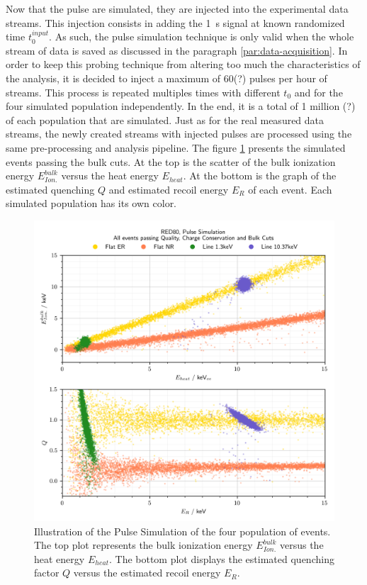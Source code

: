 Now that the pulse are simulated, they are injected into the experimental data streams. This injection consists in adding the \SI{1}{\s} signal at known randomized time $t_0^{input}$. As such, the pulse simulation technique is only valid when the whole stream of data is saved as discussed in the paragraph \ref{par:data-acquisition}. In order to keep this probing technique from altering too much the characteristics of the analysis, it is decided to inject a maximum of 60(?) pulses per hour of streams. This process is repeated multiples times with different $t_0$ and for the four simulated population independently. In the end, it is a total of 1 million (?) of each population that are simulated. Just as for the real measured data streams, the newly created streams with injected pulses are processed using the same pre-processing and analysis pipeline.
The figure \ref{fig:band-cut-ecei-simu} presents the simulated events passing the bulk cuts. At the top is the scatter of the bulk ionization energy $E_{Ion.}^{bulk}$ versus the heat energy $E_{heat}$. At the bottom is the graph of the estimated quenching $Q$ and estimated recoil energy $E_R$ of each event. Each simulated population has its own color.

\begin{figure}
\centering
\includegraphics[scale=1]{Figures/Neutron/pulse_simulation.png}
\caption{Illustration of the Pulse Simulation of the four population of events. The top plot represents the bulk ionization energy $E_{Ion.}^{bulk}$ versus the heat energy $E_{heat}$. The bottom plot displays the estimated quenching factor $Q$ versus the estimated recoil energy $E_R$.}
\label{fig:band-cut-ecei-simu}
\end{figure}

